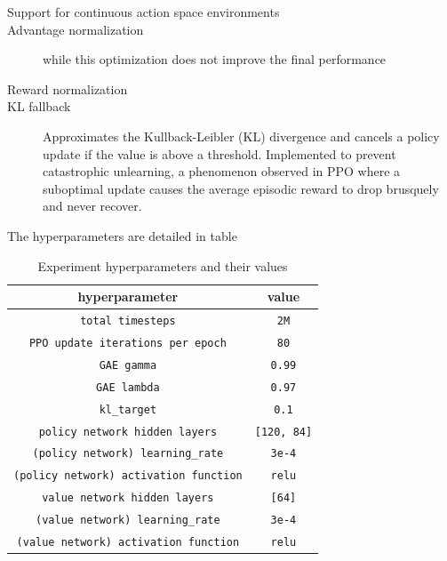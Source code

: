 \begin{description}
\item[Support for continuous action space environments] %
\item[Advantage normalization] while this optimization does not improve the final performance\cite{andrychowicz2020learning}
\item[Reward normalization]
\item[KL fallback] Approximates the Kullback-Leibler (KL) divergence and cancels a policy update if the value is above a threshold. Implemented to prevent catastrophic unlearning\cite{dossa2021empirical}, a phenomenon observed in PPO where a suboptimal update causes the average episodic reward to drop brusquely and never recover.
\end{description}

The hyperparameters are detailed in table %

\begin{table}
  \begin{center}
    \begin{tabular}{cc}
      \hline 
      hyperparameter & value \\ 
      \hline 
      \verb!total timesteps! & \verb!2M! \\
      \verb!PPO update iterations per epoch! &  \verb!80! \\
      \verb!GAE gamma! & \verb!0.99! \\
      \verb!GAE lambda! & \verb!0.97! \\
      \verb!kl_target! & \verb!0.1! \\
      \verb!policy network hidden layers! & \verb![120, 84]! \\
      \verb!(policy network) learning_rate! & \verb!3e-4! \\
      \verb!(policy network) activation function! & \verb!relu!\\
      \verb!value network hidden layers! & \verb![64]! \\
      \verb!(value network) learning_rate! & \verb!3e-4! \\
      \verb!(value network) activation function! & \verb!relu! \\
      \hline      
    \end{tabular}
  \end{center}
  \caption{Experiment hyperparameters and their values}
  \label{hyperparameters}
\end{table}



